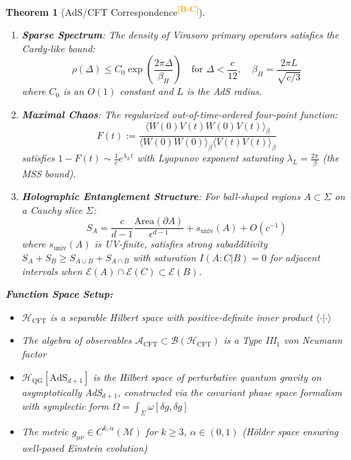 \documentclass[12pt,a4paper]{article}
\newtheorem{theorem}{Theorem}[section]
\newcommand{\levelBC}{\textsuperscript{\textcolor{orange}{\textbf{[B-C]}}}}
\begin{document}
\begin{theorem}[AdS/CFT Correspondence\levelBC]
\begin{enumerate}[label=\textbf{(H\arabic*)}]
    \item \textbf{Sparse Spectrum}: The density of Virasoro primary operators satisfies the Cardy-like bound:
    \begin{equation}
    \rho(\Delta) \leq C_0 \exp\left(\frac{2\pi\Delta}{\beta_H}\right) \quad \text{for } \Delta < \frac{c}{12}, \quad \beta_H = \frac{2\pi L}{\sqrt{c/3}}
    \end{equation}
    where $C_0$ is an $O(1)$ constant and $L$ is the AdS radius.
    
    \item \textbf{Maximal Chaos}: The regularized out-of-time-ordered four-point function:
    \begin{equation}
    F(t) := \frac{\langle W(0)V(t)W(0)V(t)\rangle_\beta}{\langle W(0)W(0)\rangle_\beta \langle V(t)V(t)\rangle_\beta}
    \end{equation}
    satisfies $1 - F(t) \sim \frac{1}{c}e^{\lambda_L t}$ with Lyapunov exponent saturating $\lambda_L = \frac{2\pi}{\beta}$ (the MSS bound).
    
    \item \textbf{Holographic Entanglement Structure}: For ball-shaped regions $A \subset \Sigma$ on a Cauchy slice $\Sigma$:
    \begin{equation}
    S_A = \frac{c}{d-1}\frac{\text{Area}(\partial A)}{\epsilon^{d-1}} + s_{\text{univ}}(A) + O(c^{-1})
    \end{equation}
    where $s_{\text{univ}}(A)$ is UV-finite, satisfies strong subadditivity $S_A + S_B \geq S_{A\cup B} + S_{A\cap B}$ with saturation $I(A:C|B) = 0$ for adjacent intervals when $\mathcal{E}(A) \cap \mathcal{E}(C) \subset \mathcal{E}(B)$.
\end{enumerate}

\textbf{Function Space Setup:}
\begin{itemize}
    \item $\mathcal{H}_{\text{CFT}}$ is a separable Hilbert space with positive-definite inner product $\langle \cdot | \cdot \rangle$
    \item The algebra of observables $\mathcal{A}_{\text{CFT}} \subset \mathcal{B}(\mathcal{H}_{\text{CFT}})$ is a Type III$_1$ von Neumann factor
    \item $\mathcal{H}_{\text{QG}}[\text{AdS}_{d+1}]$ is the Hilbert space of perturbative quantum gravity on asymptotically AdS$_{d+1}$, constructed via the covariant phase space formalism with symplectic form $\Omega = \int_\Sigma \omega[\delta g, \delta g]$
    \item The metric $g_{\mu\nu} \in C^{k,\alpha}(\mathcal{M})$ for $k \geq 3$, $\alpha \in (0,1)$ (H\"older space ensuring well-posed Einstein evolution)
\end{itemize}


\end{theorem}
\end{document}

